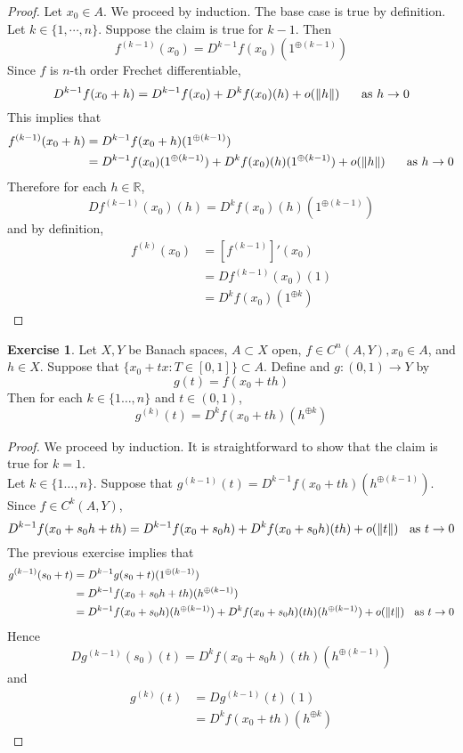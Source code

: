 \documentclass[12pt]{amsart}
\theoremstyle{definition}
\theoremstyle{remark}
\theoremstyle{definition}
\newtheorem{ex}[definition]{Exercise}
\newcommand{\R}{\mathbb{R}}
\begin{document}
	\begin{proof}
	Let $x_0 \in A$. We proceed by induction. The base case is true by definition. Let $k \in \{1, \cdots, n\}$. Suppose the claim is true for $k-1$. Then $$f^{(k-1)}(x_0) = D^{k-1}f(x_0)(1^{\oplus (k-1)})$$
	Since $f$ is $n$-th order Frechet differentiable, $$D^{k-1}f(x_0+h) = D^{k-1}f(x_0) + D^kf(x_0)(h) + o(\|h\|) \hspace{.5cm} \text{ as } h \rightarrow 0$$ 
	This implies that 
	\begin{align*}
	f^{(k-1)}(x_0+h) 
	&=  D^{k-1}f(x_0+h)(1^{\oplus (k-1)}) \\
	&= D^{k-1}f(x_0)(1^{\oplus (k-1)}) + D^kf(x_0)(h)(1^{\oplus (k-1)}) + o(\|h\|) \hspace{.5cm} \text{ as } h \rightarrow 0
	\end{align*}
	Therefore for each $h \in \R$, $$Df^{(k-1)}(x_0)(h) = D^kf(x_0)(h)(1^{\oplus (k-1)})$$
	and by definition,
	\begin{align*}
	f^{(k)}(x_0) 
	&= [f^{(k-1)}]'(x_0) \\
	&= Df^{(k-1)}(x_0)(1) \\
	&=  D^kf(x_0)(1^{\oplus k})
	\end{align*}
	\end{proof}
	
	
	
	
	\begin{ex}
	Let $X,Y$ be Banach spaces, $A \subset X$ open, $f \in C^n(A, Y), x_0 \in A$, and $h \in X$. Suppose that $\{x_0 +tx:T \in [0,1]\} \subset A$. Define and $g:(0,1) \rightarrow Y$ by $$g(t) = f(x_0 + th)$$
	Then for each $k \in \{1 \dots, n\}$ and $t \in (0,1)$, $$g^{(k)}(t) = D^kf(x_0 + th)(h^{\oplus k})$$
	\end{ex}
	
	\begin{proof}
	We proceed by induction. It is straightforward to show that the claim is true for $k=1$.\\
	Let $k \in \{1 \dots, n\}$. Suppose that $g^{(k-1)}(t) = D^{k-1}f(x_0 + th)(h^{\oplus (k-1)})$. Since $f \in C^k(A, Y)$, $$D^{k-1}f(x_0 + s_0h + th)= D^{k-1}f(x_0 + s_0h) + D^k f(x_0 + s_0h)(th) + o(\|t\|) \hspace{.2cm} \text{ as }t \rightarrow 0 $$ 
	The previous exercise implies that 
	\begin{align*}
	g^{(k-1)}(s_0 + t)
	&= D^{k-1}g(s_0+t)(1^{\oplus (k-1)}) \\
	&= D^{k-1}f(x_0 + s_0h + th)(h^{\oplus (k-1)}) \\
	&= D^{k-1}f(x_0 + s_0h)(h^{\oplus (k-1)}) + D^kf(x_0 + s_0h)(th)(h^{\oplus (k-1)}) + o(\|t\|) \hspace{.2cm} \text{ as }t \rightarrow 0
	\end{align*}
	Hence $$Dg^{(k-1)}(s_0)(t) = D^kf(x_0 + s_0h)(th)(h^{\oplus (k-1)})$$ 
	and 
	\begin{align*}
	g^{(k)}(t)
	&= Dg^{(k-1)}(t)(1) \\
	&= D^kf(x_0 + th)(h^{\oplus k})
	\end{align*}
	\end{proof}
	
\end{document}
